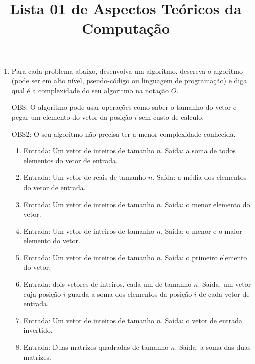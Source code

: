 \documentclass[12pt]{article}
\title{Lista 01 de Aspectos Teóricos da Computação}
\date{}
\author{}
\begin{document}
 

\maketitle

\vspace{3em}



\begin{enumerate}

\item Para cada problema abaixo, desenvolva um algoritmo, descreva o algoritmo (pode ser em alto nível, pseudo-código ou linguagem de programação) e diga qual é a complexidade do seu algoritmo na notação $O$.

OBS: O algoritmo pode usar operações como saber o tamanho do vetor e pegar um elemento do vetor da posição $i$ sem custo de cálculo.

OBS2: O seu algoritmo não precisa ter a menor complexidade conhecida.

\begin{enumerate}

\item Entrada: Um vetor de inteiros de tamanho $n$. Saída: a soma de todos elementos do vetor de entrada.

\item Entrada: Um vetor de reais de tamanho $n$. Saída: a média dos elementos do vetor de entrada.

\item Entrada: Um vetor de inteiros de tamanho $n$. Saída: o menor elemento do vetor.

\item Entrada: Um vetor de inteiros de tamanho $n$. Saída: o menor e o maior elemento do vetor.

\item Entrada: Um vetor de inteiros de tamanho $n$. Saída: o primeiro elemento do vetor.

\item Entrada: dois vetores de inteiros, cada um de tamanho $n$. Saída: um vetor cuja posição $i$ guarda a soma dos elementos da posição $i$ de cada vetor de entrada.

\item Entrada: Um vetor de inteiros de tamanho $n$. Saída: o vetor de entrada invertido.

\item Entrada: Duas matrizes quadradas de tamanho $n$. Saída: a soma das duas matrizes.


\end{enumerate}
\end{enumerate}
\end{document}
